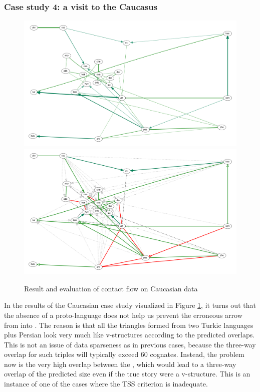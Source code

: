  \subsubsection{Case study 4: a visit to the Caucasus}
 \begin{figure}[h!]
 \includegraphics[width=\textwidth]{figures/caucasus-contact-fs-tss.pdf}
 \vspace*{5mm}
 \includegraphics[width=\textwidth]{figures/caucasus-contact-fs-tss-eval.pdf}
 \caption{Result and evaluation of contact flow on Caucasian data}
 \label{caucasus-result-contact}
 \end{figure}
 
 In the results of the Caucasian case study visualized in Figure \ref{caucasus-result-contact}, it turns out that the absence of a proto-language does not help us prevent the erroneous arrow from  into . The reason is that all the triangles formed from two Turkic languages plus Persian look very much like v-structures according to the predicted overlaps. This is not an issue of data sparseness as in previous cases, because the three-way overlap for such triples will typically exceed 60 cognates. Instead, the problem now is the very high overlap between the , which would lead to a three-way overlap of the predicted size even if the true story were a v-structure. This is an instance of one of the cases where the TSS criterion is inadequate.
 
